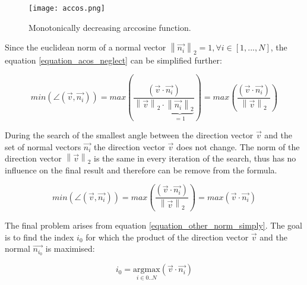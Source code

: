 \begin{figure}[H]
    \centering
    \texttt{[image: accos.png]}
    \caption{ Monotonically decreasing arccosine function.}
    \label{accos_figure}
\end{figure}

Since the euclidean norm of a normal vector $\left \| \overrightarrow{n_i} \right \|_2 = 1 , \forall i \in [1,...,N]$, the equation \ref{equation_acos_neglect} can be simplified further:


\begin{equation}
min \left (  \angle (\overrightarrow{v},\overrightarrow{n_i}) \right ) =  max \left (    \frac{(\overrightarrow{v} \cdot \overrightarrow{n_i})}{\left \| \overrightarrow{v} \right \|_2  \cdot { \underset{=1}{\underbrace{\left \| \overrightarrow{n_i} \right \|_2}}} }  \right ) = 
max \left (    \frac{(\overrightarrow{v} \cdot \overrightarrow{n_i})}{\left \| \overrightarrow{v} \right \|_2  }  \right )
\label{equation_acos_norm_simply}
\end{equation}

During the search of the smallest angle between the direction vector $\overrightarrow{v}$ and the set of normal vectors $\overrightarrow{n_i}$ the direction vector $\overrightarrow{v}$ does not change. 
The norm of the direction vector $\left \| \overrightarrow{v} \right \|_2$ is the same in every iteration of the search, thus has no influence on the final result and therefore can be remove from the formula.

\begin{equation}
min \left (  \angle (\overrightarrow{v},\overrightarrow{n_i}) \right ) = 
max \left (    \frac{(\overrightarrow{v} \cdot \overrightarrow{n_i})}{\left \| \overrightarrow{v} \right \|_2  }  \right ) = max \left (    \overrightarrow{v} \cdot \overrightarrow{n_i}  \right ) 
\label{equation_other_norm_simply}
\end{equation}

The final problem arises from equation \ref{equation_other_norm_simply}. The goal is to find the index $i_0$ for which the product of the direction vector $\overrightarrow{v}$ and the normal $\overrightarrow{n_{i_0}}$ is maximised: 

\begin{equation}
i_0 = \underset{i \in 0..N}{\mathrm{argmax}} \left (    \overrightarrow{v} \cdot \overrightarrow{n_i}  \right )
\label{equation_arg_max}
\end{equation}




